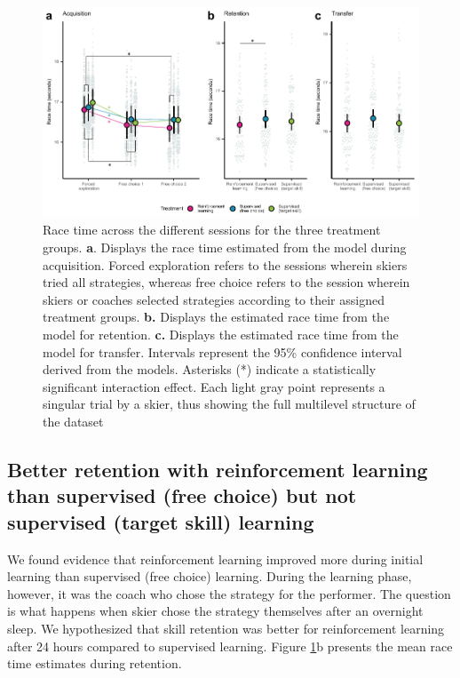 \documentclass[pdflatex,sn-mathphys-num]{sn-jnl}%
\theoremstyle{thmstyleone}%
\theoremstyle{thmstyletwo}%
\theoremstyle{thmstylethree}%
\begin{document}
\begin{figure}[H]
\centering
\includegraphics{figures/figure_racingtimes_2.pdf}
\caption{Race time across the different sessions for the three treatment groups. \textbf{a}. Displays the race time estimated from the model during acquisition. Forced exploration refers to the sessions wherein skiers tried all strategies, whereas free choice refers to the session wherein skiers or coaches selected strategies according to their assigned treatment groups. \textbf{b.} Displays the estimated race time from the model for retention. \textbf{c.} Displays the estimated race time from the model for transfer. Intervals represent the 95\% confidence interval derived from the models. Asterisks (*) indicate a statistically significant interaction effect. Each light gray point represents a singular trial by a skier, thus showing the full multilevel structure of the dataset}
\label{fig: racetime}
\end{figure}




\subsection{Better retention with reinforcement learning than supervised (free choice) but not supervised (target skill) learning} \label{result_racetime_retentipon}
We found evidence that reinforcement learning improved more during initial learning than supervised (free choice) learning. During the learning phase, however, it was the coach who chose the strategy for the performer. The question is what happens when skier chose the strategy themselves after an overnight sleep. We hypothesized that skill retention was better for reinforcement learning after 24 hours compared to supervised learning. Figure \ref{fig: racetime}b presents the mean race time estimates during retention.
\end{document}
